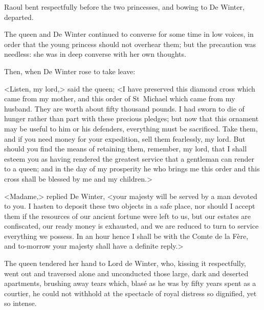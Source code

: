 Raoul bent respectfully before the two princesses, and bowing to De Winter, departed.

The queen and De Winter continued to converse for some time in low voices, in order that the young princess should not overhear them; but the precaution was needless: she was in deep converse with her own thoughts.

Then, when De Winter rose to take leave:

<Listen, my lord,> said the queen; <I have preserved this diamond cross which came from my mother, and this order of St~Michael which came from my husband. They are worth about fifty thousand pounds. I had sworn to die of hunger rather than part with these precious pledges; but now that this ornament may be useful to him or his defenders, everything must be sacrificed. Take them, and if you need money for your expedition, sell them fearlessly, my lord. But should you find the means of retaining them, remember, my lord, that I shall esteem you as having rendered the greatest service that a gentleman can render to a queen; and in the day of my prosperity he who brings me this order and this cross shall be blessed by me and my children.>

<Madame,> replied De Winter, <your majesty will be served by a man devoted to you. I hasten to deposit these two objects in a safe place, nor should I accept them if the resources of our ancient fortune were left to us, but our estates are confiscated, our ready money is exhausted, and we are reduced to turn to service everything we possess. In an hour hence I shall be with the Comte de la Fère, and to-morrow your majesty shall have a definite reply.>

The queen tendered her hand to Lord de Winter, who, kissing it respectfully, went out and traversed alone and unconducted those large, dark and deserted apartments, brushing away tears which, blasé as he was by fifty years spent as a courtier, he could not withhold at the spectacle of royal distress so dignified, yet so intense. 